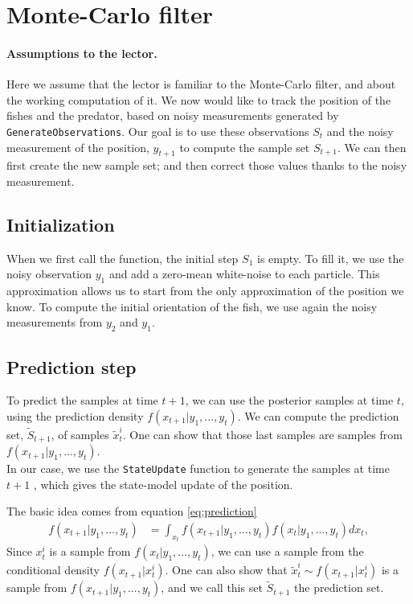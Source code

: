 \documentclass[final]{aomart}
\newtheorem[{}\it]{thm}{Theorem}[section]
\theoremstyle{definition}
\newtheorem*[{}\it]{notation}{Notation}
\numberwithin{equation}{section}
\begin{document}
\section{Monte-Carlo filter}
\paragraph{Assumptions to the lector.}Here we assume that the lector is familiar to the Monte-Carlo filter, and about the working computation of it.
 We now would like to track the position of the fishes and the predator, based on noisy measurements generated by \texttt{GenerateObservations}. Our goal is to use these observations \(S_t\) and the noisy measurement of the position, \(y_{t+1}\) to compute the sample set \(S_{t+1}\). We can then first create the new sample set; and then correct those values thanks to the noisy measurement.
 \subsection{Initialization}
 When we first call the function, the initial step \(S_1\) is empty. To fill it, we use the noisy observation \(y_1\) and add a zero-mean white-noise to each particle. This approximation allows us to start from the only approximation of the position we know. To compute the initial orientation of the fish, we use again the noisy measurements from \(y_2\) and \(y_1\).
 \subsection{Prediction step}
 To predict the samples at time \(t+1\), we can use the posterior samples at time \(t\), using the prediction density \(f(x_{t+1}|y_1,...,y_t)\). We can compute the prediction set, \(\tilde{S}_{t+1}\), of samples \(\tilde{x}_t^i \). One can show that those last samples are samples from \(f(x_{t+1}|y_1,...,y_t)\).\\
 
 In our case, we use the \texttt{StateUpdate} function to generate the samples at time \(t+1\) , which gives the state-model update of the position.
 
 The basic idea comes from equation \ref{eq:prediction}
 \begin{align}
 	f(x_{t+1}|y_1,...,y_t) & = \int_{x_t} f(x_{t+1}|y_1,...,y_t)f(x_t|y_1,...,y_t)dx_t,
 	\label{eq:prediction}
 \end{align}
 Since \(x_t^i\) is a sample from \(f(x_t|y_1,...,y_t)\), we can use a sample from the conditional density \(f(x_{t+1}|x_t^i)\). One can also show that \(\tilde{x}_t^i \sim f(x_{t+1}|x_t^i)\) is a sample from \(f(x_{t+1}|y_1,...,y_t)\), and we call this set \(\tilde{S}_{t+1}\) the prediction set.
\end{document}
